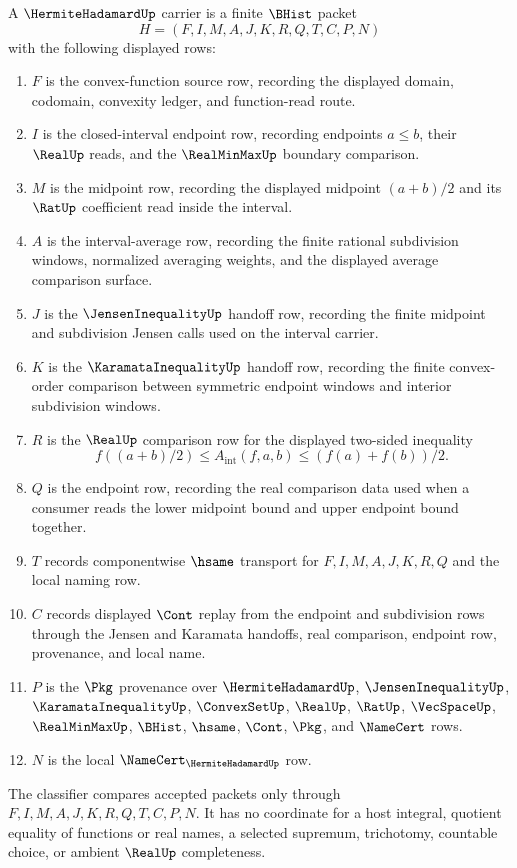 \begin{definition}
\label{def:hermite-hadamard-carrier}
A $\HermiteHadamardUp$ carrier is a finite $\BHist$ packet
$$
H=(F,I,M,A,J,K,R,Q,T,C,P,N)
$$
with the following displayed rows:
\begin{enumerate}
\item $F$ is the convex-function source row, recording the displayed domain, codomain, convexity ledger, and function-read route.
\item $I$ is the closed-interval endpoint row, recording endpoints $a \leq b$, their $\RealUp$ reads, and the $\RealMinMaxUp$ boundary comparison.
\item $M$ is the midpoint row, recording the displayed midpoint $(a+b)/2$ and its $\RatUp$ coefficient read inside the interval.
\item $A$ is the interval-average row, recording the finite rational subdivision windows, normalized averaging weights, and the displayed average comparison surface.
\item $J$ is the $\JensenInequalityUp$ handoff row, recording the finite midpoint and subdivision Jensen calls used on the interval carrier.
\item $K$ is the $\KaramataInequalityUp$ handoff row, recording the finite convex-order comparison between symmetric endpoint windows and interior subdivision windows.
\item $R$ is the $\RealUp$ comparison row for the displayed two-sided inequality
$$
f((a+b)/2) \leq A_{\mathrm{int}}(f,a,b) \leq (f(a)+f(b))/2 .
$$
\item $Q$ is the endpoint row, recording the real comparison data used when a consumer reads the lower midpoint bound and upper endpoint bound together.
\item $T$ records componentwise $\hsame$ transport for $F,I,M,A,J,K,R,Q$ and the local naming row.
\item $C$ records displayed $\Cont$ replay from the endpoint and subdivision rows through the Jensen and Karamata handoffs, real comparison, endpoint row, provenance, and local name.
\item $P$ is the $\Pkg$ provenance over $\HermiteHadamardUp$, $\JensenInequalityUp$, $\KaramataInequalityUp$, $\ConvexSetUp$, $\RealUp$, $\RatUp$, $\VecSpaceUp$, $\RealMinMaxUp$, $\BHist$, $\hsame$, $\Cont$, $\Pkg$, and $\NameCert$ rows.
\item $N$ is the local $\NameCert_{\HermiteHadamardUp}$ row.
\end{enumerate}
The classifier compares accepted packets only through $F,I,M,A,J,K,R,Q,T,C,P,N$. It has no coordinate for a host integral, quotient equality of functions or real names, a selected supremum, trichotomy, countable choice, or ambient $\RealUp$ completeness.
\end{definition}

